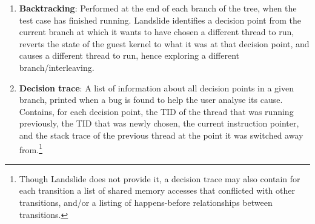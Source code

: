 \begin{enumerate}
	\item {\bf Backtracking}:
		Performed at the end of each branch of the tree, when the test case has finished running. Landslide identifies a decision point from the current branch at which it wants to have chosen a different thread to run, reverts the state of the guest kernel to what it was at that decision point, and causes a different thread to run, hence exploring a different branch/interleaving.
	\item {\bf Decision trace}:
		A list of information about all decision points in a given branch, printed when a bug is found to help the user analyse its cause. Contains, for each decision point, the TID of the thread that was running previously, the TID that was newly chosen, the current instruction pointer, and the stack trace of the previous thread at the point it was switched away from.\footnote{Though Landslide does not provide it, a decision trace may also contain for each transition a list of shared memory accesses that conflicted with other transitions, and/or a listing of happens-before relationships between transitions.}
\end{enumerate}

